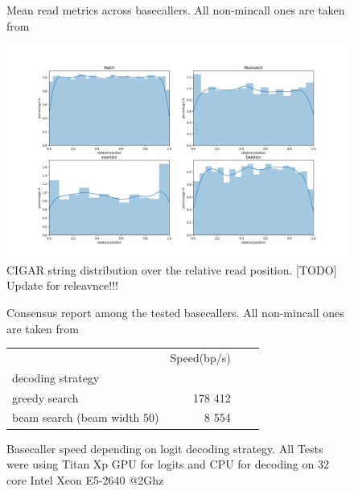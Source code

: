 \documentclass[times, utf8, diplomski, english]{fer}
\begin{document}
\begin{figure}
\label{fg:tbp:all_metrics}

\caption{Mean read metrics across basecallers. All non-mincall ones are taken from~\cite{rwick_basecalling_cmp}}
\end{figure}

\begin{figure}
    \label{fg:error_distribution}
    \begin{center}
        \includegraphics[width=\textwidth]{alignment_b0_position_report.png}
        \caption{CIGAR string distribution over the relative read position. [TODO] Update for releavnce!!!}
    \end{center}
\end{figure}

\begin{figure}
\label{fg:concensus_report}

\caption{Consensus report among the tested basecallers. All non-mincall ones are taken from~\cite{rwick_basecalling_cmp}}
\end{figure}

\begin{figure}
\label{fg:basecaller_speed}
\begin{tabular}{lrrr}
\toprule
{}                          &    Speed(bp/s) \\
decoding strategy           &                \\
\midrule
greedy search               &  178 412   \\
beam search (beam width 50) &  8 554     \\
\bottomrule
\end{tabular}
\caption{Basecaller speed depending on logit decoding strategy. All Tests were using Titan Xp GPU for logits and CPU for decoding on 32 core Intel Xeon E5-2640 @2Ghz}
\end{figure}
\end{document}
